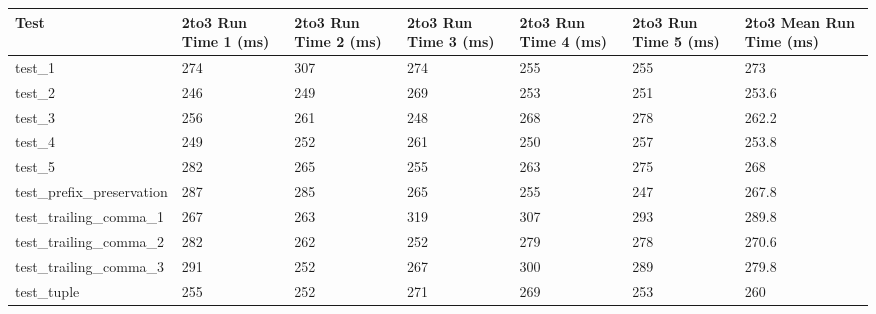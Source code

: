 \begin{table*}[ht]
    \centering
    \begin{tabular}{@{}l|p{5em}p{5em}p{5em}p{5em}p{5em}p{5em}@{}}
    \toprule
    Test                                  & 2to3 Run Time 1 (ms) & 2to3 Run Time 2 (ms) & 2to3 Run Time 3 (ms) & 2to3 Run Time 4 (ms) & 2to3 Run Time 5 (ms) & 2to3 Mean Run Time (ms) \\ \midrule
    test\_1                               & 274                  & 307                  & 274                  & 255                  & 255                  & 273                        \\
    test\_2                               & 246                  & 249                  & 269                  & 253                  & 251                  & 253.6                      \\
    test\_3                               & 256                  & 261                  & 248                  & 268                  & 278                  & 262.2                      \\ 
    test\_4                               & 249                  & 252                  & 261                  & 250                  & 257                  & 253.8                      \\
    test\_5                               & 282                  & 265                  & 255                  & 263                  & 275                  & 268                        \\
    test\_prefix\_preservation            & 287                  & 285                  & 265                  & 255                  & 247                  & 267.8                      \\
    test\_trailing\_comma\_1              & 267                  & 263                  & 319                  & 307                  & 293                  & 289.8                      \\
    test\_trailing\_comma\_2              & 282                  & 262                  & 252                  & 279                  & 278                  & 270.6                      \\
    test\_trailing\_comma\_3              & 291                  & 252                  & 267                  & 300                  & 289                  & 279.8                      \\
    test\_tuple                           & 255                  & 252                  & 271                  & 269                  & 253                  & 260                        \\

\end{tabular}
\end{table*}
